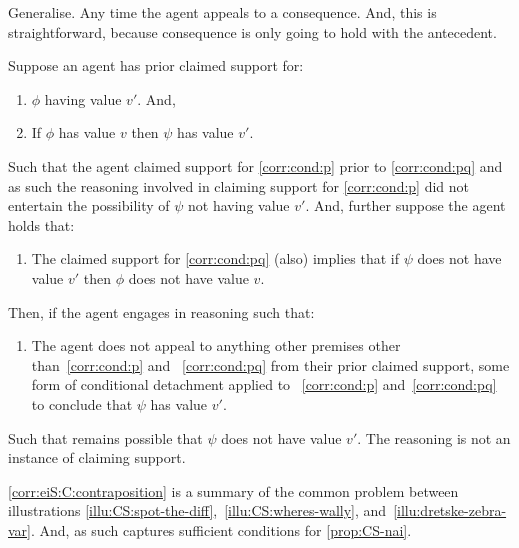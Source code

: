 \begin{note}
  Generalise.
  Any time the agent appeals to a consequence.
  And, this is straightforward, because consequence is only going to hold with the antecedent.

  \begin{corollary}\label{corr:eiS:C:contraposition}
    Suppose an agent has prior claimed support for:
    \begin{enumerate}[label=\arabic*., ref=(\arabic*)]
    \item\label{corr:cond:p} \(\phi\) having value \(v'\). And,
    \item\label{corr:cond:pq} If \(\phi\) has value \(v\) then \(\psi\) has value \(v'\).
  \end{enumerate}
  Such that the agent claimed support for \ref{corr:cond:p} prior to \ref{corr:cond:pq} and as such the reasoning involved in claiming support for \ref{corr:cond:p} did not entertain the possibility of \(\psi\) not having value \(v'\).
  And, further suppose the agent holds that:
  \begin{enumerate}[label=\arabic*., ref=(\arabic*), resume]
    \item The claimed support for \ref{corr:cond:pq} (also) implies that if \(\psi\) does not have value \(v'\) then \(\phi\) does not have value \(v\).
  \end{enumerate}
  Then, if the agent engages in reasoning such that:
    \begin{enumerate}[label=\arabic*., ref=(\arabic*), resume]
    \item The agent does not appeal to anything other premises other than~\ref{corr:cond:p} and ~\ref{corr:cond:pq} from their prior claimed support, some form of conditional detachment applied to ~\ref{corr:cond:p} and~\ref{corr:cond:pq} to conclude that \(\psi\) has value \(v'\).
    \end{enumerate}
    Such that remains possible that \(\psi\) does not have value \(v'\).
    The reasoning is not an instance of claiming support.
  \end{corollary}

  \autoref{corr:eiS:C:contraposition} is a summary of the common problem between illustrations \ref{illu:CS:spot-the-diff},~\ref{illu:CS:wheres-wally}, and~\ref{illu:dretske-zebra-var}.
  And, as such captures sufficient conditions for \autoref{prop:CS-nai}.
\end{note}

